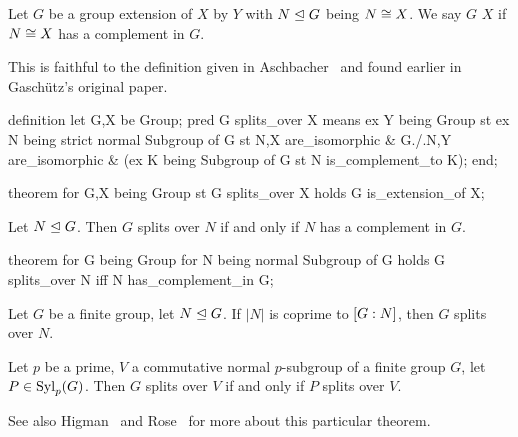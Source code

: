 \begin{definition}
Let $G$ be a group extension of $X$ by $Y$ with $N\trianglelefteq G$
being $N\cong X$. We say $G$  $X$ if $N\cong X$ has a
complement in $G$.
\end{definition}

\begin{def-remark}
This is faithful to the definition given in Aschbacher~\cite[(\S10)]{aschbacher2000finite}
and found earlier in Gasch\"{u}tz's original paper.
\end{def-remark}

\begin{mizar}
definition
  let G,X be Group;
  pred G splits_over X means
  ex Y being Group st
  ex N being strict normal Subgroup of G st
  N,X are_isomorphic & G./.N,Y are_isomorphic &
  (ex K being Subgroup of G st N is_complement_to K);
end;

theorem
  for G,X being Group
  st G splits_over X
  holds G is_extension_of X;
\end{mizar}

\begin{theorem}
Let $N\trianglelefteq G$. Then $G$ splits over $N$ if and only if $N$
has a complement in $G$.
\end{theorem}

\begin{mizar}
theorem
  for G being Group
  for N being normal Subgroup of G
  holds G splits_over N iff N has_complement_in G;
\end{mizar}

\begin{theorem}[Schur]
Let $G$ be a finite group, let $N\trianglelefteq G$.
If $|N|$ is coprime to $[G : N]$, then $G$ splits over $N$.
\end{theorem}

\begin{theorem}
Let $p$ be a prime, $V$ a commutative normal $p$-subgroup of a finite
group $G$, let $P\in\mathop{\rm Syl}\nolimits_{p}(G)$. 
Then $G$ splits over $V$ if and only if $P$ splits over $V$.
\end{theorem}

\begin{thm-remark}
See also Higman~\cite{higman1954remarks} and Rose~\cite{rose1966} for
more about this particular theorem. 
\end{thm-remark}


